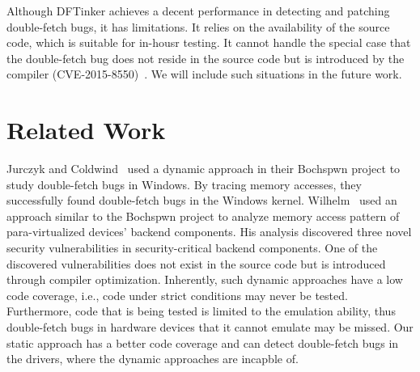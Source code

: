 \documentclass[10pt]{llncs}
\begin{document}
Although DFTinker achieves a decent performance in detecting and patching double-fetch bugs, it has limitations. It relies on the availability of the source code, which is suitable for in-housr testing. It cannot handle the special case that the double-fetch bug does not reside in the source code but is introduced by the compiler (CVE-2015-8550)~\cite{wilhelm15tracing}. We will include such situations in the future work. 





\section{Related Work}
\label{related}



Jurczyk and Coldwind~\cite{bochspwn,jurczyk2013identifying} used a dynamic approach in their Bochspwn project to study double-fetch bugs in Windows. By tracing memory accesses, they successfully found double-fetch bugs in the Windows kernel. Wilhelm~\cite{wilhelm15tracing} used an approach similar to the
Bochspwn project to analyze memory access pattern of para-virtualized
devices' backend components. His analysis discovered three novel security
vulnerabilities in security-critical backend components. One of the
discovered vulnerabilities does not exist in the source code but is
introduced through compiler optimization.
Inherently, such dynamic approaches have a low code coverage, i.e., code under strict conditions may never be tested. Furthermore, code that is being tested is limited to the emulation ability, thus double-fetch bugs in hardware devices that it cannot emulate may be missed. Our static approach has a better code coverage and can detect double-fetch bugs in the drivers, where the dynamic approaches are incapble of.
\end{document}
